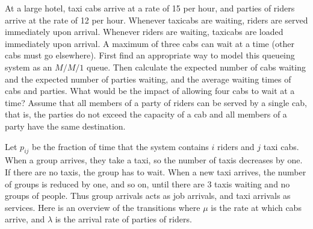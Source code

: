\begin{exercise}[Hall 5.22]\label{ex:95}
 At  a large hotel, taxi cabs arrive at a rate of 15 per hour, and parties of riders arrive at the rate of 12 per hour.
 Whenever taxicabs are waiting, riders are served immediately upon arrival.
 Whenever riders are waiting, taxicabs are loaded immediately upon arrival.
 A maximum of three cabs can wait at a time (other cabs must go elsewhere).
First find an appropriate way to model this queueing system as an $M/M/1$ queue. Then
 calculate the expected number of cabs waiting and the expected number of parties waiting, and the average waiting times of cabs and parties.
 What would be the impact of allowing four cabs to wait at a time?
Assume that all members of a party of riders can be served by a single cab, that is, the parties do not exceed the capacity of a cab and all members of a party have the same destination.
\begin{hint}
  Let $p_{ij}$ be the fraction of time that the system contains $i$ riders and $j$ taxi cabs.
  When a group arrives, they take a taxi, so the number of taxis decreases by one. If there are no taxis, the group has to wait.
  When a new taxi arrives, the number of groups is reduced by one, and so on, until there are $3$ taxis waiting and no groups of people.
Thus group arrivals acts as job arrivals, and taxi arrivals as services.
Here is an overview of the transitions  where  $\mu$ is the rate at which cabs arrive, and $\lambda$ is the arrival rate of parties of riders.
 \begin{center}
\end{center}
\end{hint}
\end{exercise}
